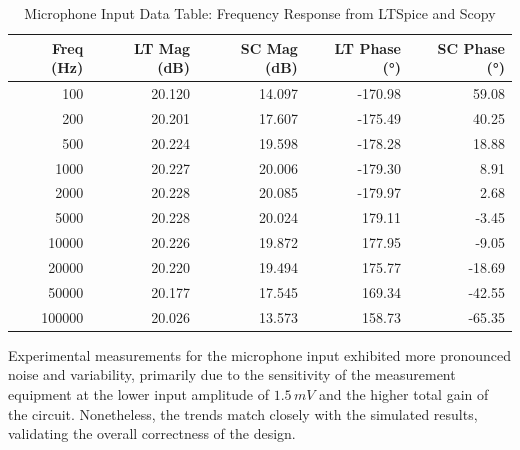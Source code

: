 \documentclass[12pt]{article}
\begin{document}
\begin{table}[H]
	\centering
	\footnotesize
	\caption{Microphone Input Data Table: Frequency Response from LTSpice and Scopy}
	\label{tab:mic_data}
	\renewcommand{\arraystretch}{0.9}
	\begin{tabular}{|r|r|r|r|r|}
		\hline
		\textbf{Freq (Hz)} & \textbf{LT Mag (dB)} & \textbf{SC Mag (dB)} & \textbf{LT Phase (°)} & \textbf{SC Phase (°)} \\ \hline
		100                & 20.120               & 14.097               & -170.98               & 59.08                 \\ \hline
		200                & 20.201               & 17.607               & -175.49               & 40.25                 \\ \hline
		500                & 20.224               & 19.598               & -178.28               & 18.88                 \\ \hline
		1000               & 20.227               & 20.006               & -179.30               & 8.91                  \\ \hline
		2000               & 20.228               & 20.085               & -179.97               & 2.68                  \\ \hline
		5000               & 20.228               & 20.024               & 179.11                & -3.45                 \\ \hline
		10000              & 20.226               & 19.872               & 177.95                & -9.05                 \\ \hline
		20000              & 20.220               & 19.494               & 175.77                & -18.69                \\ \hline
		50000              & 20.177               & 17.545               & 169.34                & -42.55                \\ \hline
		100000             & 20.026               & 13.573               & 158.73                & -65.35                \\ \hline
	\end{tabular}
\end{table}
Experimental measurements for the microphone input exhibited more pronounced
noise and variability, primarily due to the sensitivity of the measurement
equipment at the lower input amplitude of $1.5\,mV$ and the higher total gain of the circuit. Nonetheless, the trends match closely with the simulated results, validating the overall correctness of the design.
\end{document}
